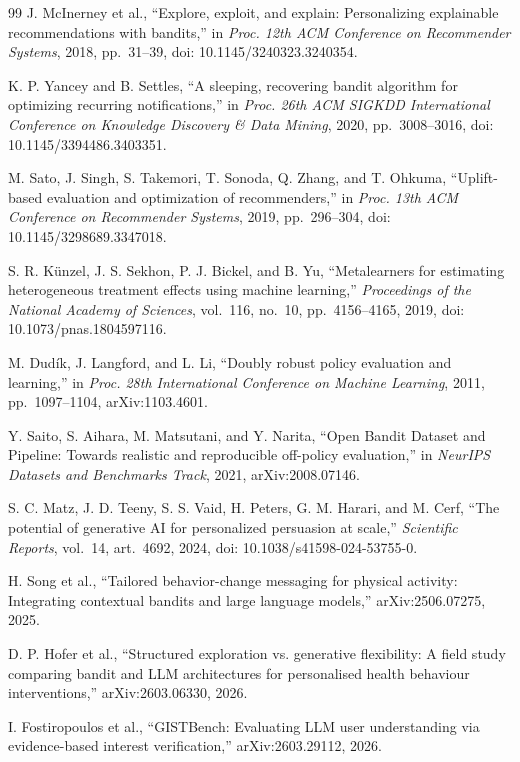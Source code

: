 \documentclass{misisarticle}
\begin{document}
\begin{thebibliography}{99}
 J. McInerney et al., “Explore, exploit, and explain: Personalizing explainable recommendations with bandits,” in \textit{Proc. 12th ACM Conference on Recommender Systems}, 2018, pp.~31--39, doi: 10.1145/3240323.3240354.

 K. P. Yancey and B. Settles, “A sleeping, recovering bandit algorithm for optimizing recurring notifications,” in \textit{Proc. 26th ACM SIGKDD International Conference on Knowledge Discovery \& Data Mining}, 2020, pp.~3008--3016, doi: 10.1145/3394486.3403351.

 M. Sato, J. Singh, S. Takemori, T. Sonoda, Q. Zhang, and T. Ohkuma, “Uplift-based evaluation and optimization of recommenders,” in \textit{Proc. 13th ACM Conference on Recommender Systems}, 2019, pp.~296--304, doi: 10.1145/3298689.3347018.

 S. R. Künzel, J. S. Sekhon, P. J. Bickel, and B. Yu, “Metalearners for estimating heterogeneous treatment effects using machine learning,” \textit{Proceedings of the National Academy of Sciences}, vol.~116, no.~10, pp.~4156--4165, 2019, doi: 10.1073/pnas.1804597116.

 M. Dudík, J. Langford, and L. Li, “Doubly robust policy evaluation and learning,” in \textit{Proc. 28th International Conference on Machine Learning}, 2011, pp.~1097--1104, arXiv:1103.4601.

 Y. Saito, S. Aihara, M. Matsutani, and Y. Narita, “Open Bandit Dataset and Pipeline: Towards realistic and reproducible off-policy evaluation,” in \textit{NeurIPS Datasets and Benchmarks Track}, 2021, arXiv:2008.07146.

 S. C. Matz, J. D. Teeny, S. S. Vaid, H. Peters, G. M. Harari, and M. Cerf, “The potential of generative AI for personalized persuasion at scale,” \textit{Scientific Reports}, vol.~14, art.~4692, 2024, doi: 10.1038/s41598-024-53755-0.

 H. Song et al., “Tailored behavior-change messaging for physical activity: Integrating contextual bandits and large language models,” arXiv:2506.07275, 2025.

 D. P. Hofer et al., “Structured exploration vs. generative flexibility: A field study comparing bandit and LLM architectures for personalised health behaviour interventions,” arXiv:2603.06330, 2026.

 I. Fostiropoulos et al., “GISTBench: Evaluating LLM user understanding via evidence-based interest verification,” arXiv:2603.29112, 2026.


\end{thebibliography}
\end{document}
